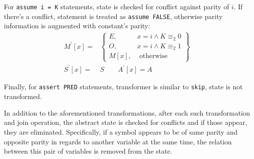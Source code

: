 For \texttt{assume i = K} statements, state is checked for conflict against parity of $i$. If there's a conflict, statement is treated as  \texttt{assume FALSE}, otherwise parity information is augmented with constant's parity:
\begin{align*}
M^\prime[x] = & \left.
	\begin{cases}
		{E}, & x = i \wedge K \equiv_{2} 0 \\
		{O}, & x = i \wedge K \equiv_{2} 1 \\
		M[x], & \text{ otherwise}
	\end{cases}
\right\}\\
S^\prime[x] = & S \qquad
A^\prime[x] =  A
\end{align*}


Finally, for \texttt{assert PRED} statements, transformer is similar to \texttt{skip}, state is not transformed.

In addition to the aforementioned transformations, after each such transformation and join operation, the abstract state is checked for conflicts and if those appear, they are eliminated. Specifically, if a symbol appears to be of same parity and opposite parity in regards to another variable at the same time, the relation between this pair of variables is removed from the state.
